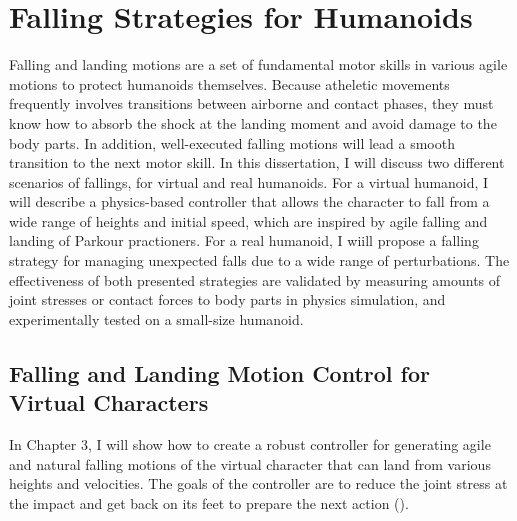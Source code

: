 \section{Falling Strategies for Humanoids}
Falling and landing motions are a set of fundamental motor skills
in various agile motions to protect humanoids themselves.
Because atheletic movements frequently involves
transitions between airborne and contact phases, they must know how to
absorb the shock at the landing moment and avoid damage to the body parts.
In addition, well-executed falling motions will lead a smooth transition to the
next motor skill. 
In this dissertation, I will discuss two different scenarios of fallings, 
for  virtual and real humanoids.
For a virtual humanoid, I will describe a physics-based controller that allows
the character to fall from a wide range of heights and initial speed, 
which are inspired by agile falling and landing of Parkour practioners.
For a real humanoid, I wiill propose a falling strategy for managing unexpected
falls due to a wide range of perturbations.
The effectiveness of both presented strategies are validated by measuring
amounts of joint stresses or contact forces to body parts in physics
simulation, and experimentally tested on a small-size humanoid.

\subsection{Falling and Landing Motion Control for Virtual Characters}

In Chapter 3, I will show how to create a robust controller for generating 
agile and natural falling motions of the virtual character that can land from 
various heights and velocities.
The goals of the controller are to reduce the joint stress at the impact and
get back on its feet to prepare the next action ().

